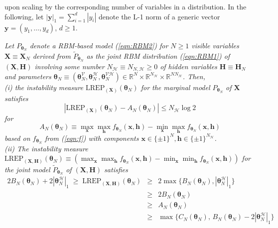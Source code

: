 \documentclass[12pt]{article}
\theoremstyle{definition}
\newcommand{\REP}{\mathrm{LREP}}
\newcommand{\elt}{A_{N}(\boldsymbol \theta_N) }
\newcommand{\Gam}{B_{N}(\boldsymbol \theta_N) }
\newcommand{\Gamc}{C_{N}(\boldsymbol \theta_N) }
\begin{document}
 upon scaling by the corresponding number of variables in a distribution.
In the following, let $|\boldsymbol y|_1 = \sum_{i=1}^d |y_i|$ denote the L-1 norm of a generic vector $\boldsymbol y =(y_1,\ldots,y_d)$, $d \geq 1$.
 \begin{proposition1}
  \label{prop2} {\it Let $P_{\boldsymbol \theta_N}$ denote a RBM-based  model  (\ref{eqn:RBM2}) for $N\geq 1$ visible variables
  $\boldsymbol X \equiv \boldsymbol X_N$ derived from $\tilde{P}_{\boldsymbol \theta_N}$ as the joint RBM distribution   (\ref{eqn:RBM1}) of $(\boldsymbol X,\boldsymbol H)$ involving some number  $N_{\mathcal{H}}\equiv  N_{N,\mathcal{H}}\geq 0$  of hidden variables $\boldsymbol H \equiv \boldsymbol H_N$ and parameters $\boldsymbol \theta_N \equiv (\boldsymbol \theta_N^{\mathcal{V}},\boldsymbol \theta_N^{\mathcal{H}}, \boldsymbol \theta_N^{\mathcal{VH}}  ) \in\mathbb{R}^{N}\times \mathbb{R}^{N_{\mathcal{H}}} \times  \mathbb{R}^{N N_{\mathcal{H}}}$. Then, \\
  (i)   the instability measure $\REP_{(\boldsymbol X)}(\boldsymbol \theta_N)$ for the marginal model $P_{\boldsymbol \theta_N}$ of  $\boldsymbol X$ satisfies
\[
         \left|   \REP_{(\boldsymbol X)}(\boldsymbol \theta_N)  - \elt\right| \leq    N_{\mathcal{H}}  \log 2
\]
for
\[
\elt  \equiv   \max_{ \boldsymbol x} \max_{ \boldsymbol h  } f_{\boldsymbol \theta_N} (\boldsymbol x, \boldsymbol h)-\min_{ \boldsymbol x } \max_{ \boldsymbol h }f_{\boldsymbol \theta_N} (\boldsymbol x, \boldsymbol h)
\]
based on $f_{\boldsymbol \theta_N}$ from (\ref{eqn:f}) with components
 $\boldsymbol x \in \{\pm 1\}^{N}, \boldsymbol h \in \{\pm 1\}^{N_{\mathcal{H}}}$.  \\
 (ii)  The instability measure $\REP_{(\boldsymbol X, \boldsymbol H)}(\boldsymbol \theta_N)\equiv \left(\max_{ \boldsymbol x} \max_{ \boldsymbol h  } f_{\boldsymbol \theta_N} (\boldsymbol x, \boldsymbol h)-\min_{ \boldsymbol x } \min_{ \boldsymbol h }f_{\boldsymbol \theta_N} (\boldsymbol x, \boldsymbol h)\right) $ for the joint model $\tilde{P}_{\boldsymbol \theta_N}$ of $(\boldsymbol X, \boldsymbol H)$ satisfies
    \begin{eqnarray*}
    2\Gam +  2|\boldsymbol \theta_N^{\mathcal{H}} |_{1} \; \geq \; \REP_{(\boldsymbol X, \boldsymbol H)}(\boldsymbol \theta_N)    & \geq &
     2\max\big\{\Gam,   |\boldsymbol \theta_N^{\mathcal{H}} |_{1}\big\} \\
     &\geq & 2\Gam\\
     &\geq & \elt\\
       &\geq &  \max\big\{  \Gamc, \, \Gam  - 2|\boldsymbol \theta_N^{\mathcal{H}} |_{1}  \big\}

\end{eqnarray*}}
\end{proposition1}
\end{document}
